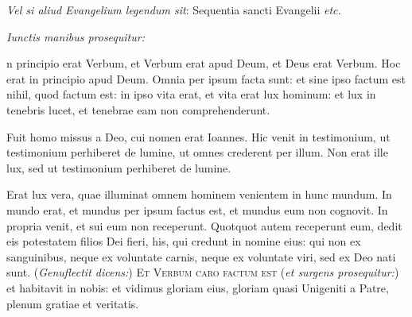 \textit{Vel si aliud Evangelium legendum sit}: Sequentia sancti Evangelii
\textit{etc.}


\textit{Iunctis manibus prosequitur:}

\pagebreak


n principio erat Verbum, et Verbum erat apud Deum, et Deus erat
Verbum.  Hoc erat in principio apud Deum.  Omnia per ipsum facta sunt: et sine
ipso factum est nihil, quod factum est: in ipso vita erat, et vita erat lux
hominum: et lux in tenebris lucet, et tenebrae eam non comprehenderunt.

Fuit homo missus a Deo, cui nomen erat Ioannes.  Hic venit in testimonium, ut
testimonium perhiberet de lumine, ut omnes crederent per illum.  Non erat ille
lux, sed ut testimonium perhiberet de lumine.

Erat lux vera, quae illuminat omnem hominem venientem in hunc mundum.  In mundo
erat, et mundus per ipsum factus est, et mundus eum non cognovit.  In propria
venit, et sui eum non receperunt.  Quotquot autem receperunt eum, dedit eis
potestatem filios Dei fieri, his, qui credunt in nomine eius: qui non ex
sanguinibus, neque ex voluntate carnis, neque ex voluntate viri, sed ex Deo nati
sunt.  (\textit{Genuflectit dicens:}) \textsc{Et Verbum caro factum est}
(\textit{et surgens prosequitur:}) et habitavit in nobis: et vidimus gloriam
eius, gloriam quasi Unigeniti a Patre, plenum gratiae et veritatis.

